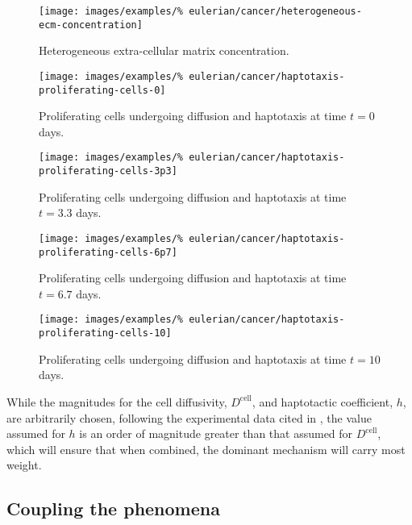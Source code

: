 \begin{figure}[!hptb]
\centering
\texttt{[image: images/examples/\%
eulerian/cancer/heterogeneous-ecm-concentration]}
\caption{Heterogeneous extra-cellular matrix concentration.}
\label{heterogeneous-ecm-concentration}
\end{figure}

\begin{figure}[!hptb]
\centering
\texttt{[image: images/examples/\%
eulerian/cancer/haptotaxis-proliferating-cells-0]}
\caption{Proliferating cells undergoing diffusion and haptotaxis at time $t=0$ days.}
\label{tumour-haptotaxis-proliferation-0}
\end{figure}

\begin{figure}[!hptb]
\centering
\texttt{[image: images/examples/\%
eulerian/cancer/haptotaxis-proliferating-cells-3p3]}
\caption{Proliferating cells undergoing diffusion and haptotaxis at time $t=3.3$ days.}
\label{tumour-haptotaxis-proliferation-3p3}
\end{figure}

\begin{figure}[!hptb]
\centering
\texttt{[image: images/examples/\%
eulerian/cancer/haptotaxis-proliferating-cells-6p7]}
\caption{Proliferating cells undergoing diffusion and haptotaxis at time $t=6.7$ days.}
\label{tumour-haptotaxis-proliferation-6p7}
\end{figure}

\begin{figure}[!hptb]
\centering
\texttt{[image: images/examples/\%
eulerian/cancer/haptotaxis-proliferating-cells-10]}
\caption{Proliferating cells undergoing diffusion and haptotaxis at time $t=10$ days.}
\label{tumour-haptotaxis-proliferation-10}
\end{figure}

While the magnitudes for the cell diffusivity, $D^{\mathrm{cell}}$,
and haptotactic coefficient, $h$, are arbitrarily chosen, following
the experimental data cited in \citet{namyetal:04}, the value assumed
for $h$ is an order of magnitude greater than that assumed for
$D^{\mathrm{cell}}$, which will ensure that when combined, the
dominant mechanism will carry most weight.

\subsection{Coupling the phenomena}
\label{cacophonous-medley}

